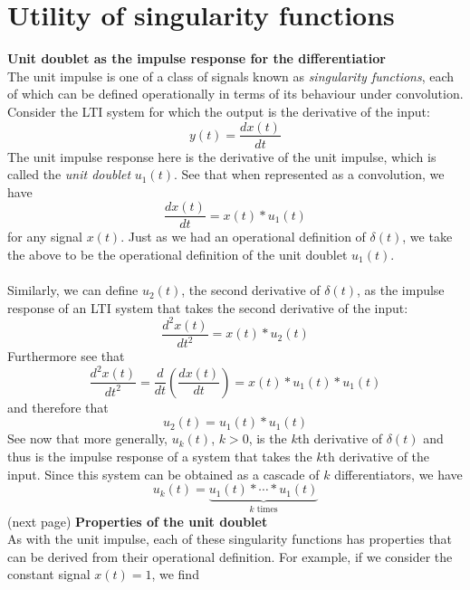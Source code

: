 \documentclass{report}
\begin{document}
\section{Utility of singularity functions}
\textbf{Unit doublet as the impulse response for the differentiatior}\\
The unit impulse is one of a class of signals known as \textit{singularity functions}, each of which can be defined operationally in terms of its behaviour under convolution. Consider the LTI system for
which the output is the derivative of the input:
\begin{equation*}
y(t)=\frac{dx(t)}{dt}
\end{equation*}
The unit impulse response here is the derivative of the unit impulse, which is called the \textit{unit doublet} $u_1(t)$. See that when represented as a convolution, we have
\begin{equation*}
\frac{dx(t)}{dt}=x(t)*u_1(t)
\end{equation*}
for any signal $x(t)$. Just as we had an operational definition of $\delta(t)$, we take the above to be the operational definition of the unit doublet $u_1(t)$.\\
\vspace{1mm}\\
Similarly, we can define $u_2(t)$, the second derivative of $\delta(t)$, as the impulse response of an LTI system that takes the second derivative of the input:
\begin{equation*}
\frac{d^2x(t)}{dt^2}=x(t)*u_2(t)
\end{equation*}
Furthermore see that
\begin{equation*}
\frac{d^2x(t)}{dt^2}=\frac{d}{dt}\left(\frac{dx(t)}{dt}\right)=x(t)*u_1(t)*u_1(t)
\end{equation*}
and therefore that
\begin{equation*}
u_2(t)=u_1(t)*u_1(t)
\end{equation*}
See now that more generally, $u_k(t)$, $k>0$, is the $k$th derivative of $\delta(t)$ and thus is the impulse response of a system that takes the $k$th derivative of the input. Since this system
can be obtained as a cascade of $k$ differentiators, we have
\begin{equation*}
u_k(t)=\underbrace{u_1(t)*\cdots*u_1(t)}_{k\text{ times}}
\end{equation*}
(next page)\newpage
\noindent\textbf{Properties of the unit doublet}\\
As with the unit impulse, each of these singularity functions has properties that can be derived from their operational definition. For example, if we consider the constant signal $x(t)=1$, we find
\end{document}
